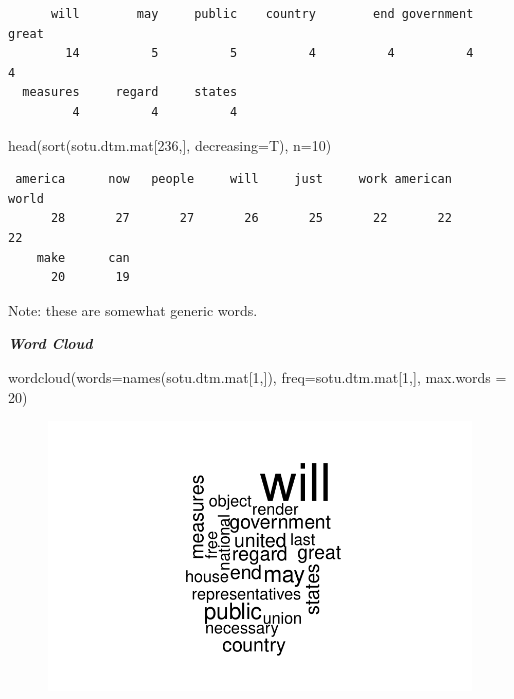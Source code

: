 \documentclass[
  letterpaper,
  DIV=11,
  numbers=noendperiod]{scrreprt}
\newenvironment{Shaded}{\begin{snugshade}}{\end{snugshade}}
\newcommand{\AttributeTok}[1]{\textcolor[rgb]{0.40,0.45,0.13}{#1}}
\newcommand{\DecValTok}[1]{\textcolor[rgb]{0.68,0.00,0.00}{#1}}
\newcommand{\FunctionTok}[1]{\textcolor[rgb]{0.28,0.35,0.67}{#1}}
\newcommand{\NormalTok}[1]{\textcolor[rgb]{0.00,0.23,0.31}{#1}}
\begin{document}
\begin{verbatim}
      will        may     public    country        end government      great 
        14          5          5          4          4          4          4 
  measures     regard     states 
         4          4          4 
\end{verbatim}

\begin{Shaded}
\begin{Highlighting}[]
\FunctionTok{head}\NormalTok{(}\FunctionTok{sort}\NormalTok{(sotu.dtm.mat[}\DecValTok{236}\NormalTok{,], }\AttributeTok{decreasing=}\NormalTok{T), }\AttributeTok{n=}\DecValTok{10}\NormalTok{)}
\end{Highlighting}
\end{Shaded}

\begin{verbatim}
 america      now   people     will     just     work american    world 
      28       27       27       26       25       22       22       22 
    make      can 
      20       19 
\end{verbatim}

Note: these are somewhat generic words.

\textbf{\emph{Word Cloud}}

\begin{Shaded}
\begin{Highlighting}[]
\FunctionTok{wordcloud}\NormalTok{(}\AttributeTok{words=}\FunctionTok{names}\NormalTok{(sotu.dtm.mat[}\DecValTok{1}\NormalTok{,]),}
          \AttributeTok{freq=}\NormalTok{sotu.dtm.mat[}\DecValTok{1}\NormalTok{,], }\AttributeTok{max.words =} \DecValTok{20}\NormalTok{)}
\end{Highlighting}
\end{Shaded}

\begin{figure}[H]

{\centering \includegraphics{11-TextasData_files/figure-pdf/unnamed-chunk-11-1.pdf}

}

\end{figure}
\end{document}
